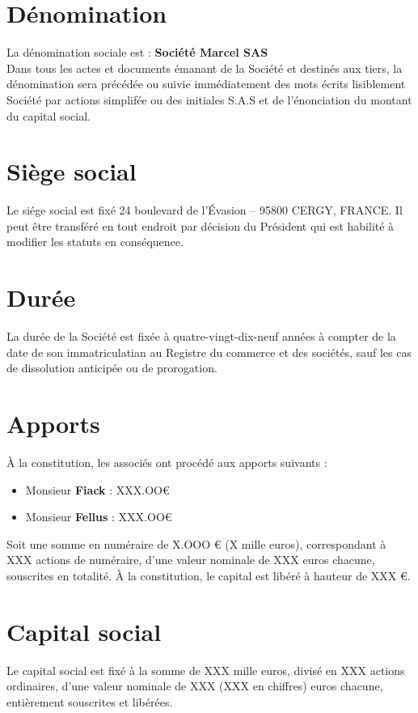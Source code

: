 \documentclass[a4paper,12pt]{report}
\newcommand{\address}{24 boulevard de l'Évasion -- 95800 CERGY, FRANCE}
\begin{document}
\section{Dénomination}
La dénomination sociale est : \og \textbf{Société Marcel SAS} \fg{}\\
Dans tous les actes et documents émanant de la Société et destinés aux tiers, 
la dénomination sera précédée ou suivie immédiatement des mots écrits lisiblement \og Société par actions simplifée \fg{} 
ou des initiales \og S.A.S \fg{} et de l'énonciation du montant du capital social.

\section{Siège social}
Le siége social est fixé \address. 
Il peut être transféré en tout endroit par décision du Président qui est habilité à modifier les statuts en conséquence.

\section{Durée}
La durée de la Société est fixée à quatre-vingt-dix-neuf années à compter de la date de son immatriculatian au Registre du commerce et des sociétés, 
sauf les cas de dissolution anticipée ou de prorogation.

\section{Apports}
À la constitution, les associés ont procédé aux apports suivants :
\begin{itemize}
	\item Monsieur \textbf{Fiack} :         XXX.OO€
	\item Monsieur \textbf{Fellus} :         XXX.OO€
\end{itemize}

Soit une somme en numéraire de X.OOO € (X mille euros), correspondant à XXX actions de numéraire, d'une valeur nominale de XXX euros chacune, souscrites en totalité. 
À la constitution, le capital est libéré à hauteur de XXX €.

\section{Capital social}
Le capital social est fixé à la somme de XXX mille euros, divisé en XXX actions ordinaires,
d'une valeur nominale de XXX (XXX en chiffres) euros chacune, entièrement souscrites et libérées.
\end{document}
